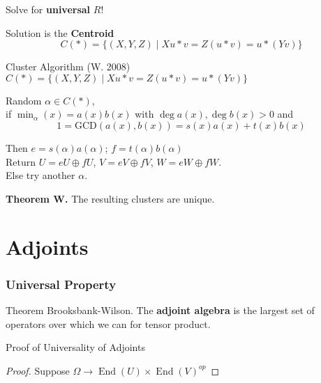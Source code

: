 \documentclass{beamer}
\DeclareMathOperator{\Span}{Span}
\DeclareMathOperator{\End}{End}
\begin{document}
\begin{frame}[fragile]
    Solve for \textbf{universal} $R$!

    \centering

    Solution is the \textbf{Centroid}
    \[
        C(*)=\{(X,Y,Z)\mid Xu*v=Z(u*v)=u*(Yv)\}
    \]
\end{frame}

\begin{frame}{Cluster Algorithm (W. 2008)}
    $C(*)=\{(X,Y,Z)\mid  Xu*v=Z(u*v)=u*(Yv)\}$

    Random $\alpha\in C(*)$, \\
    if $\min_{\alpha}(x)=a(x) b(x)$ with $\deg a(x),\deg b(x)>0$ and 
    \[1=\mathrm{GCD}(a(x),b(x))=s(x)a(x)+t(x)b(x)\]

    Then $e = s(\alpha )a(\alpha)$; $f=t(\alpha)b(\alpha)$\\
    Return $U=eU\oplus fU$, $V=eV\oplus fV$, $W=eW\oplus fW$.\\
    
    Else try another $\alpha$. 

    \bigskip

    \textbf{Theorem W.} The resulting clusters are unique.

\end{frame}


\section{Adjoints}

\begin{frame}
    \frametitle{Universal Property}

    \begin{block}{Theorem Brooksbank-Wilson.}
    The \textbf{adjoint algebra} is the largest set of operators 
    over which we can for tensor product.
    \end{block}
\end{frame}

\begin{frame}{Proof of Universality of Adjoints}
    \begin{proof}
        Suppose $\Omega\to \End(U)\times \End(V)^{op}$
    \end{proof}
\end{frame}
\end{document}
